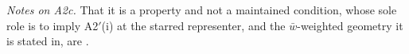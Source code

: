 \noindent\emph{Notes on A2c.} That it is a property and not a maintained condition, whose sole role is to
imply A2$'$(i) at the starred representer, and the $\bar w$-weighted geometry it is stated in, are .

%
%
